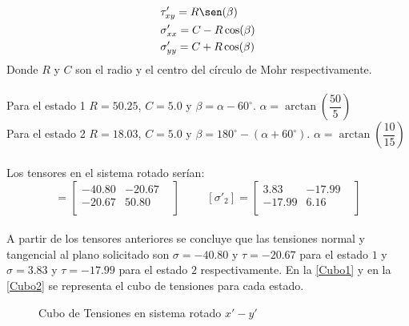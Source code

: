 \documentclass[../notas medios.tex]{subfiles}
\begin{document}
\begin{enumerate}
%
\begin {equation}
\begin {aligned}
 &\tau'_{xy} = R  \sen (\beta) \\
 &\sigma'_{xx} = C - R  \cos(\beta) \\
 &\sigma'_{yy} = C + R  \cos(\beta) \\
\end {aligned}
\label{cicmohr1}
\end {equation}
%
Donde $R$ y $C$ son el radio  y el centro del círculo de Mohr
respectivamente.\\\\
%
Para el estado 1 $R = 50.25$, $C = 5.0$ y $\beta =\alpha - 60 ^{\circ}$. $\alpha
= \arctan\left(\dfrac{50}{5}\right)$ \\
%
Para el estado 2 $R = 18.03 $, $C = 5.0$ y $\beta =180^{\circ} - (\alpha +
60^{\circ})$. $\alpha = \arctan\left(\dfrac{10}{15}\right)$ \\\\
%
Los tensores en el sistema rotado serían: \\
 \begin{equation*}
[\sigma'_1] =
 	\begin{bmatrix}
     	-40.80 & -20.67 & \\
     	-20.67 & 50.80 \\
 	\end{bmatrix}
 \hspace{1cm}
 [\sigma'_2] =
 	\begin{bmatrix}
     	3.83 & -17.99 & \\
     	-17.99 & 6.16 \\
 	\end{bmatrix}
\end{equation*} \\
A partir de los tensores anteriores se concluye que las tensiones normal y tangencial
al plano solicitado son $\sigma=-40.80$ y  $\tau = -20.67$ para el estado $1$ y
$\sigma=3.83$ y  $\tau = -17.99$ para el estado $2$ respectivamente. En la
\cref{Cubo1} y en la \cref{Cubo2} se representa el cubo de tensiones para cada estado.
%

\begin{figure}[H]
	\centering
		\hspace{0.5cm}
	\caption{Cubo de Tensiones en sistema rotado $x'-y'$ }
	\label{Cubos}
\end{figure}


\end{enumerate}
\end{document}
